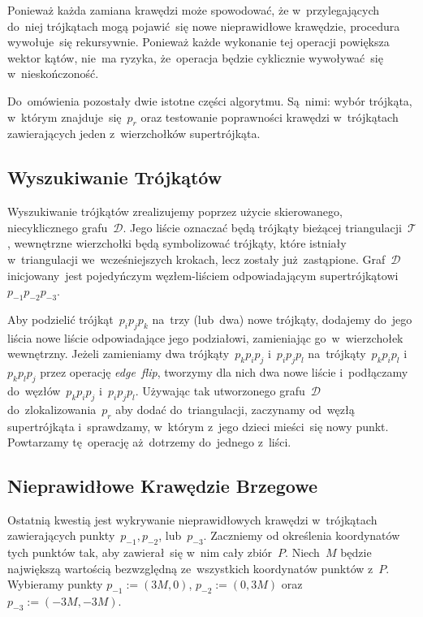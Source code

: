 \documentclass[skorowidz,autorrok,backref,xodstep,oswiadczenie]{wmimgr}
\begin{document}
Ponieważ każda zamiana krawędzi może spowodować, że w~przylegających do~niej trójkątach mogą pojawić~się nowe nieprawidłowe krawędzie, procedura wywołuje~się rekursywnie. Ponieważ każde wykonanie tej operacji powiększa wektor kątów, nie~ma ryzyka, że~operacja będzie cyklicznie wywoływać~się w~nieskończoność.

Do~omówienia pozostały dwie istotne części algorytmu. Są~nimi: wybór trójkąta, w~którym znajduje~się~$p_{r}$ oraz testowanie poprawności krawędzi w~trójkątach zawierających jeden z~wierzchołków supertrójkąta.

\subsection{Wyszukiwanie Trójkątów}

Wyszukiwanie trójkątów zrealizujemy poprzez użycie skierowanego, niecyklicznego grafu~$\mathcal{D}$. Jego liście oznaczać będą trójkąty bieżącej triangulacji~$\mathcal{T}$, wewnętrzne wierzchołki będą symbolizować trójkąty, które istniały w~triangulacji we~wcześniejszych krokach, lecz zostały już~zastąpione. Graf~$\mathcal{D}$ inicjowany~jest pojedyńczym węzłem-liściem odpowiadającym supertrójkątowi~$p_{-1} p_{-2} p_{-3}$.

Aby podzielić trójkąt~$p_{i} p_{j} p_{k}$ na~trzy (lub~dwa) nowe trójkąty, dodajemy do~jego liścia nowe liście odpowiadające jego podziałowi, zamieniając go~w~wierzchołek wewnętrzny. Jeżeli zamieniamy dwa trójkąty~$p_{k} p_{i} p_{j}$ i~$p_{i} p_{j} p_{l}$ na~trójkąty~$p_{k} p_{i} p_{l}$ i~$p_{k} p_{l} p_{j}$ przez operację \emph{edge~flip}, tworzymy dla nich dwa nowe liście i~podłączamy do~węzłów~$p_{k} p_{i} p_{j}$ i~$p_{i} p_{j} p_{l}$. Używając tak utworzonego grafu~$\mathcal{D}$ do~zlokalizowania~$p_{r}$ aby dodać do~triangulacji, zaczynamy od~węzłą supertrójkąta i~sprawdzamy, w~którym z~jego dzieci mieści~się nowy punkt. Powtarzamy tę~operację aż~dotrzemy do~jednego z~liści.

\subsection{Nieprawidłowe Krawędzie Brzegowe}

Ostatnią kwestią jest wykrywanie nieprawidłowych krawędzi w~trójkątach zawierających punkty~$p_{-1}, p_{-2}$, lub~$p_{-3}$. Zaczniemy od określenia koordynatów tych punktów tak, aby zawierał~się w~nim cały zbiór~$P$. Niech~$M$ będzie największą wartością bezwzględną ze~wszystkich koordynatów punktów z~$P$. Wybieramy punkty $p_{-1} := (3M, 0)$, $p_{-2} := (0, 3M)$ oraz $p_{-3} := (-3M, -3M)$.
\end{document}
